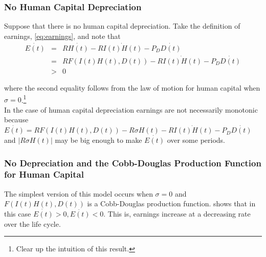 \subsubsection{No Human Capital Depreciation}
Suppose that there is no human capital depreciation. Take the definition of earnings, \eqref{eq:earnings}, and note that
\begin{eqnarray}
\dot{E(t)} &=& R \dot{H(t)} - R \dot{I(t)H(t)} - P_{D} \dot{D(t)} \nonumber \\
           &=& R F \left( I(t) H(t), D(t) \right) - R \dot{I(t)H(t)} - P_{D} \dot{D(t)} \nonumber \\     
           &>& 0 
\end{eqnarray}

\noindent where the second equality follows from the law of motion for human capital when $\sigma = 0$.\footnote{Clear up the intuition of this result.}\\
\indent In the case of human capital depreciation earnings are not necessarily monotonic because $\dot{E(t)} = R F \left( I(t) H(t), D(t) \right) - R \sigma H(t) - R \dot{I(t)H(t)} - P_{D} \dot{D(t)}$ and $| R \sigma H(t) | $ may be big enough to make $\dot{E(t)}$ over some periods.
\subsubsection{No Depreciation and the Cobb-Douglas Production Function for Human Capital}

\noindent The simplest version of this model occurs when $\sigma = 0$ and $F(I(t) H(t), D(t))$ is a Cobb-Douglas production function. \citet{ben1967production} shows that in this case $\dot{E(t)} > 0, \ddot{E(t)} < 0$. This is, earnings increase at a decreasing rate over the life cycle.\\

